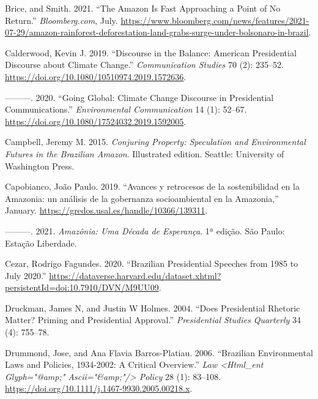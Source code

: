 \documentclass[
]{article}
\newlength{\cslhangindent}
\newlength{\cslentryspacingunit} %
\newenvironment{CSLReferences}[2] %
 {%
  \setlength{\parindent}{0pt}
  \ifodd #1
  \let\oldpar\par
  \def\par{\hangindent=\cslhangindent\oldpar}
  \fi
  \setlength{\parskip}{#2\cslentryspacingunit}
 }%
 {}
\begin{document}
\begin{CSLReferences}{1}{0}
\leavevmode{}%
Brice, and Smith. 2021. {``The Amazon Is Fast Approaching a Point of No
Return.''} \emph{Bloomberg.com}, July.
\url{https://www.bloomberg.com/news/features/2021-07-29/amazon-rainforest-deforestation-land-grabs-surge-under-bolsonaro-in-brazil}.

\leavevmode{}%
Calderwood, Kevin J. 2019. {``Discourse in the Balance: American
Presidential Discourse about Climate Change.''} \emph{Communication
Studies} 70 (2): 235--52.
\url{https://doi.org/10.1080/10510974.2019.1572636}.

\leavevmode{}%
---------. 2020. {``Going Global: Climate Change Discourse in
Presidential Communications.''} \emph{Environmental Communication} 14
(1): 52--67. \url{https://doi.org/10.1080/17524032.2019.1592005}.

\leavevmode{}%
Campbell, Jeremy M. 2015. \emph{Conjuring Property: Speculation and
Environmental Futures in the Brazilian Amazon}. Illustrated edition.
Seattle: University of Washington Press.

\leavevmode{}%
Capobianco, João Paulo. 2019. {``Avances y retrocesos de la
sostenibilidad en la Amazonia: un análisis de la gobernanza
socioambiental en la Amazonia,''} January.
\url{https://gredos.usal.es/handle/10366/139311}.

\leavevmode{}%
---------. 2021. \emph{Amazônia: Uma Década de Esperança}. 1ª edição.
São Paulo: Estação Liberdade.

\leavevmode{}%
Cezar, Rodrigo Fagundes. 2020. {``Brazilian Presidential Speeches from
1985 to July 2020.''}
\url{https://dataverse.harvard.edu/dataset.xhtml?persistentId=doi:10.7910/DVN/M9UU09}.

\leavevmode{}%
Druckman, James N, and Justin W Holmes. 2004. {``Does Presidential
Rhetoric Matter? Priming and Presidential Approval.''}
\emph{Presidential Studies Quarterly} 34 (4): 755--78.

\leavevmode{}%
Drummond, Jose, and Ana Flavia Barros-Platiau. 2006. {``Brazilian
Environmental Laws and Policies, 1934-2002: A Critical Overview.''}
\emph{Law \textless Html{\_}ent Glyph={"}@amp;{"}
Ascii={"}\&amp;{"}/\textgreater{} Policy} 28 (1): 83--108.
\url{https://doi.org/10.1111/j.1467-9930.2005.00218.x}.


\end{CSLReferences}
\end{document}
